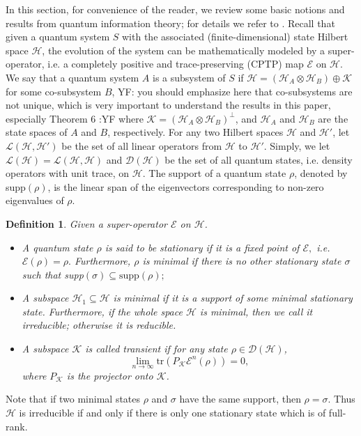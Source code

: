 \documentclass[journal]{IEEEtran}
\def\h{\ensuremath{\mathcal{H}}}
\def\l{\ensuremath{\mathcal{L}}}
\def\k{\ensuremath{\mathcal{K}}}
\def\e{\ensuremath{\mathcal{E}}}
\def\l{\ensuremath{\mathcal{L}}}
\def\d{\ensuremath{\mathcal{D}}}
\def\l{\mathcal{L}}
\def\k{\mathcal{K}}
\newtheorem{definition}{Definition}
\newcommand{\authorComment}[3]{\color{#1}#2: {#3} :#2\color{black}}
\newcommand{\yf}[1]{\authorComment{blue}{YF}{#1}}
\begin{document}
In this section, for convenience of the reader, we review some basic notions and results from quantum information theory; for details we refer to \cite{nielsen2010quantum}. Recall that given a quantum system $S$ with the associated (finite-dimensional) state Hilbert space $\h$, the evolution of the system can be mathematically  modeled by a super-operator, i.e. a completely positive  and trace-preserving (CPTP) map $\e$ on $\h$.  We say that a quantum system $A$ is a subsystem of $S$ if $\h=(\h_A\otimes\h_B)\oplus \k$ for some co-subsystem $B$,  \yf{you should emphasize here that co-subsystems are not unique, which is very important to understand the results in this paper, especially Theorem 6} where $\k=(\h_A\otimes\h_B)^\perp$, and $\h_A$ and $\h_B$ are the state spaces  of $A$ and $B$, respectively.  
  For any two Hilbert spaces $\h$ and $\h'$, let $\l(\h,\h')$ be the set of all linear operators from $\h$ to $\h'$. Simply, we let $\l(\h)=\l(\h,\h)$ and $\d(\h)$ be the set of all quantum states, i.e. density operators with unit trace, on $\h$.  The support of a quantum state $\rho$, denoted by supp$(\rho)$, is the linear span of the eigenvectors corresponding to non-zero eigenvalues of $\rho.$ 
\begin{definition}
  Given a super-operator $\e$ on $\h$. 
  \begin{itemize}
    \item[(1)] A quantum state  $\rho$ is said to be stationary if it is a fixed point of $\e,$ i.e. $\e(\rho)=\rho.$ Furthermore, $\rho$ is minimal if there is no other stationary state $\sigma$ such that supp$(\sigma)\subseteq \textrm{supp}(\rho);$
    \item[(2)] A subspace $\h_1\subseteq \h$ is minimal if it is a support of some minimal stationary state. Furthermore, if the whole space $\h$ is minimal, then we call it irreducible; otherwise it is reducible.
    \item[(3)] A subspace $\k$ is called transient if for any state $\rho\in \d(\h)$, $$\lim_{n\rightarrow \infty}\textrm{tr}(P_\k\e^n(\rho))=0,$$ where $P_\k$ is the projector onto $\k$. 
  \end{itemize} 
\end{definition}

Note that if two minimal states $\rho$ and $\sigma$ have the same support, then $\rho=\sigma$. Thus $\h$ is irreducible if and only if there is only one  stationary state which is of full-rank.
\end{document}
